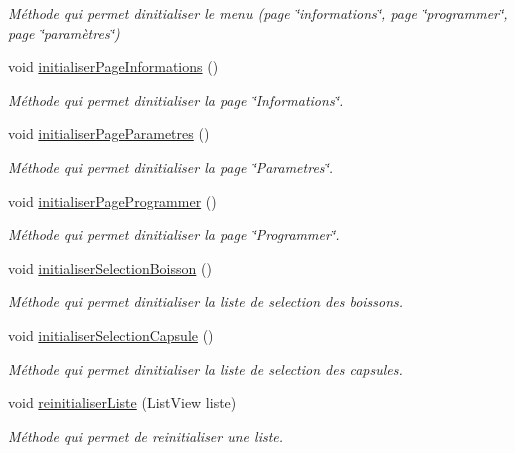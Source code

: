 \begin{DoxyCompactItemize}
\begin{DoxyCompactList}\small\item\em Méthode qui permet d\textquotesingle{}initialiser le menu (page \char`\"{}informations\char`\"{}, page \char`\"{}programmer\char`\"{}, page \char`\"{}paramètres\char`\"{}) \end{DoxyCompactList}\item 
void \hyperlink{classcom_1_1example_1_1ekawa_1_1_ihm_ad431346f0a437b4f23697208c5048a02}{initialiser\+Page\+Informations} ()
\begin{DoxyCompactList}\small\item\em Méthode qui permet d\textquotesingle{}initialiser la page \char`\"{}\+Informations\char`\"{}. \end{DoxyCompactList}\item 
void \hyperlink{classcom_1_1example_1_1ekawa_1_1_ihm_af18a3c8df11503003c92e8e5de89b7c3}{initialiser\+Page\+Parametres} ()
\begin{DoxyCompactList}\small\item\em Méthode qui permet d\textquotesingle{}initialiser la page \char`\"{}\+Parametres\char`\"{}. \end{DoxyCompactList}\item 
void \hyperlink{classcom_1_1example_1_1ekawa_1_1_ihm_aa5ef2c0c4b4cefb518ec4f3e05b098aa}{initialiser\+Page\+Programmer} ()
\begin{DoxyCompactList}\small\item\em Méthode qui permet d\textquotesingle{}initialiser la page \char`\"{}\+Programmer\char`\"{}. \end{DoxyCompactList}\item 
void \hyperlink{classcom_1_1example_1_1ekawa_1_1_ihm_a0a4086cea2ee9d6d18c957513706cbce}{initialiser\+Selection\+Boisson} ()
\begin{DoxyCompactList}\small\item\em Méthode qui permet d\textquotesingle{}initialiser la liste de selection des boissons. \end{DoxyCompactList}\item 
void \hyperlink{classcom_1_1example_1_1ekawa_1_1_ihm_a32a1b0d802eef67b6c838d8839de7bdb}{initialiser\+Selection\+Capsule} ()
\begin{DoxyCompactList}\small\item\em Méthode qui permet d\textquotesingle{}initialiser la liste de selection des capsules. \end{DoxyCompactList}\item 
void \hyperlink{classcom_1_1example_1_1ekawa_1_1_ihm_a4c6ea5a7de9f8fc5c820fa4c8ce14838}{reinitialiser\+Liste} (List\+View liste)
\begin{DoxyCompactList}\small\item\em Méthode qui permet de reinitialiser une liste. \end{DoxyCompactList}\end{DoxyCompactItemize}
